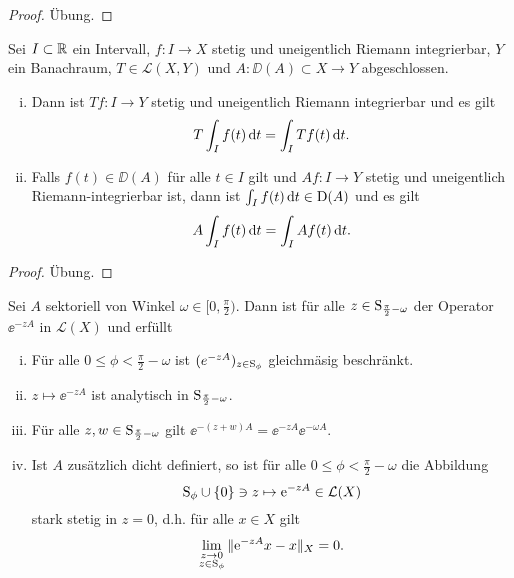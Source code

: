 \begin{proof}
  Übung.
\end{proof}

\begin{prop}
  \label{prop:opInIntegral}
  Sei $I \subset \mathbb{R}$ ein Intervall, $f \colon I \to X$ stetig und uneigentlich Riemann integrierbar, $Y$ ein Banachraum, $T \in \mathcal{L}(X,Y)$ und $A \colon \DD(A) \subset X \to Y$ abgeschlossen.
  \begin{enumerate}[(i)]
    \item Dann ist $Tf \colon I \to Y$ stetig und uneigentlich Riemann integrierbar und es gilt
      $$
      T \int_I f(t) \, {\operatorname{d}\!{t}} = \int_I Tf(t)\, {\operatorname{d}\!{t}}.
      $$
    \item Falls $f(t) \in \DD(A)$ für alle $t \in I$ gilt und $Af \colon I \to Y$ stetig und uneigentlich Riemann-integrierbar ist, dann ist $\int_I f(t) \, {\operatorname{d}\!{t}} \in \mathrm{D}(A)$ und es gilt 
      $$
      A \int_I f(t) \, {\operatorname{d}\!{t}} = \int_I A f(t) \, {\operatorname{d}\!{t}}.
      $$
  \end{enumerate}
\end{prop}

\begin{proof}
  Übung.
\end{proof}

\begin{thm}
  Sei $A$ sektoriell von Winkel $\omega \in [0,\frac{\pi}{2})$.
    Dann ist für alle $z \in \mathrm{S}_{\frac{\pi}{2} - \omega}$ der Operator $\ee^{-zA}$ in $\mathcal{L}(X)$ und erfüllt
    \begin{enumerate}[(i)]
      \item Für alle $0 \leq \phi < \frac{\pi}{2} - \omega$ ist $(e^{-zA})_{z \in \mathrm{S}_\phi}$ gleichmäsig beschränkt.
      \item $z \mapsto \ee^{-zA}$ ist analytisch in $\mathrm{S}_{\frac{\pi}{2} - \omega}$.
      \item Für alle $z,w \in \mathrm{S}_{\frac{\pi}{2} - \omega}$ gilt 
        $
        \ee^{-(z + w)A} = \ee^{-zA}\ee^{-\omega A}.
        $
      \item Ist $A$ zusätzlich dicht definiert, so ist für alle $0 \leq \phi < \frac{\pi}{2} - \omega$ die Abbildung
        $$
        \mathrm{S}_\phi \cup \{0\} \ni z \mapsto \mathrm{e}^{-z A} \in \mathcal{L}(X)
        $$
        stark stetig in $z = 0$, d.h. für alle $x \in X$ gilt
        $$
        \lim_{\substack{z \to 0 \\ z \in \mathrm{S}_\phi}} \|\mathrm{e}^{-zA} x - x\|_X = 0.
        $$
    \end{enumerate}
\end{thm}

